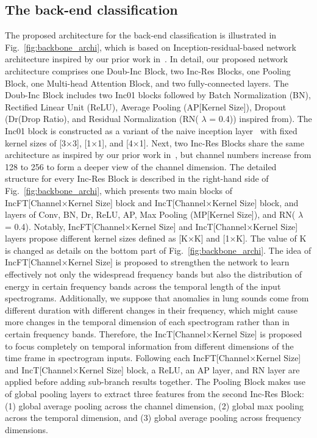 \documentclass[conference]{IEEEtran}
\begin{document}
\subsection{The back-end classification}

The proposed architecture for the back-end classification is illustrated in Fig.~\ref{fig:backbone_archi}, which is based on Inception-residual-based network architecture inspired by our prior work in~\cite{pham2022wider}. 
In detail, our proposed network architecture comprises one Doub-Inc Block, two Inc-Res Blocks, one Pooling Block, one Multi-head Attention Block, and two fully-connected layers. 
The Doub-Inc Block includes two Inc01 blocks followed by Batch Normalization (BN), Rectified Linear Unit (ReLU), Average Pooling (AP[Kernel Size]), Dropout (Dr(Drop Ratio), and Residual Normalization (RN( $\lambda$ = 0.4)) inspired from\cite{kim2022qti}). 
The Inc01 block is constructed as a variant of the naive inception layer~\cite{szegedy2015going} with fixed kernel sizes of [3×3], [1×1], and [4×1]. 
Next, two Inc-Res Blocks share the same architecture as inspired by our prior work in~\cite{pham2022wider}, but channel numbers increase from 128 to 256 to form a deeper view of the channel dimension. 
The detailed structure for every Inc-Res Block is described in the right-hand side of Fig.~\ref{fig:backbone_archi}, which presents two main blocks of IncFT[Channel×Kernel Size] block and IncT[Channel×Kernel Size] block, and layers of Conv, BN, Dr, ReLU, AP, Max Pooling (MP[Kernel Size]), and RN( $\lambda$ = 0.4). 
Notably, IncFT[Channel×Kernel Size] and IncT[Channel×Kernel Size] layers propose different kernel sizes defined as [K×K] and [1×K]. The value of K is changed as details on the bottom part of Fig.~\ref{fig:backbone_archi}. 
The idea of IncFT[Channel×Kernel Size] is proposed to strengthen the network to learn effectively not only the widespread frequency bands but also the distribution of energy in certain frequency bands across the temporal length of the input spectrograms. 
Additionally, we suppose that anomalies in lung sounds come from different duration with different changes in their frequency, which might cause more changes in the temporal dimension of each spectrogram rather than in certain frequency bands. 
Therefore, the IncT[Channel×Kernel Size] is proposed to focus completely on temporal information from different dimensions of the time frame in spectrogram inputs. Following each IncFT[Channel×Kernel Size] and IncT[Channel×Kernel Size] block, a ReLU, an AP layer, and RN layer are applied before adding sub-branch results together. 
%
The Pooling Block makes use of global pooling layers to extract three features from the second Inc-Res Block: (1) global average pooling across the channel dimension, (2) global max pooling across the temporal dimension, and (3) global average pooling across frequency dimensions. 
\end{document}
